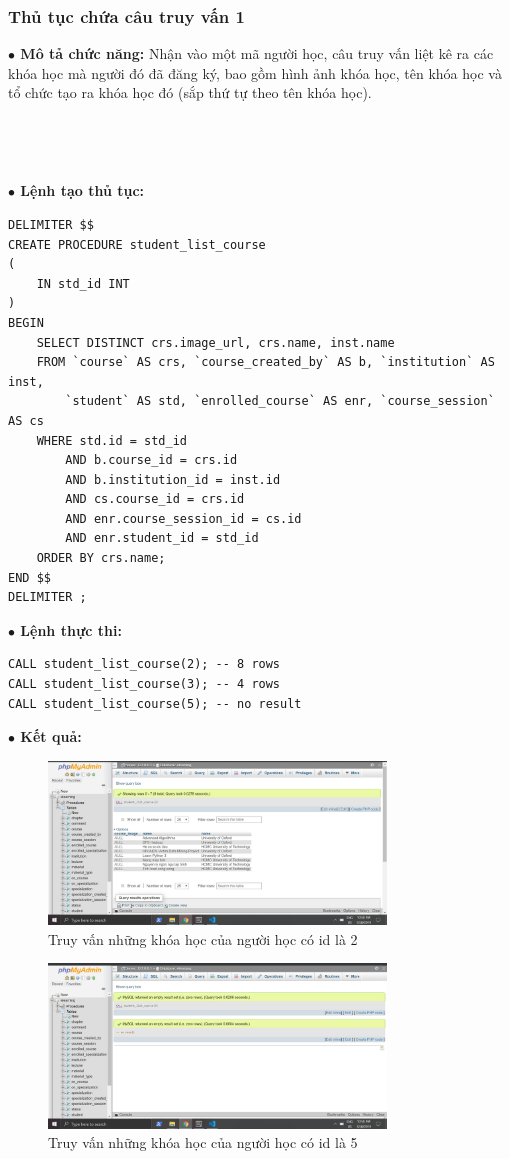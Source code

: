 \documentclass[12pt,a4paper,titlepage]{article}
\begin{document}
\subsubsection{Thủ tục chứa câu truy vấn 1}
\textbf{$\bullet$ Mô tả chức năng:} Nhận vào một mã người học, câu truy vấn liệt kê ra các khóa học mà người đó đã đăng ký, bao gồm hình ảnh khóa học, tên khóa học và tổ chức tạo ra khóa học đó (sắp thứ tự theo tên khóa học).\\\\\\\\\\
\textbf{$\bullet$ Lệnh tạo thủ tục:}
\begin{lstlisting}
DELIMITER $$
CREATE PROCEDURE student_list_course
(
    IN std_id INT
)
BEGIN
	SELECT DISTINCT crs.image_url, crs.name, inst.name
	FROM `course` AS crs, `course_created_by` AS b, `institution` AS inst,
		`student` AS std, `enrolled_course` AS enr, `course_session` AS cs
	WHERE std.id = std_id
        AND b.course_id = crs.id
        AND b.institution_id = inst.id
        AND cs.course_id = crs.id
        AND enr.course_session_id = cs.id
        AND enr.student_id = std_id
	ORDER BY crs.name;
END $$
DELIMITER ;
\end{lstlisting}
\textbf{$\bullet$ Lệnh thực thi:}
\begin{lstlisting}
CALL student_list_course(2); -- 8 rows
CALL student_list_course(3); -- 4 rows
CALL student_list_course(5); -- no result
\end{lstlisting}
\textbf{$\bullet$ Kết quả:}
\begin{figure}[h!]
	\centering
	\caption{Truy vấn những khóa học của người học có id là 2}
	\includegraphics[width=0.8\textwidth]{images/proc1h.png}
\end{figure}
\newpage
\begin{figure}[h!]
	\centering
	\caption{Truy vấn những khóa học của người học có id là 5}
	\includegraphics[width=0.8\textwidth]{images/proc1nh.png}
\end{figure}
\end{document}
